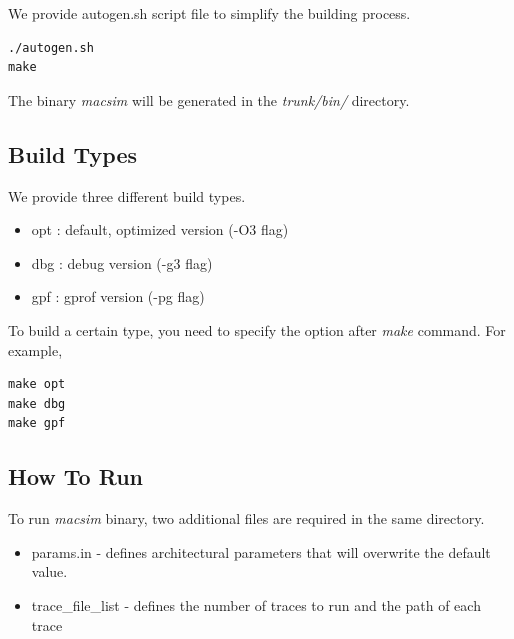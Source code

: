 \noindent
We provide autogen.sh script file to simplify the building process.

\begin{Verbatim}
./autogen.sh
make
\end{Verbatim}

The binary \textit{macsim} will be generated in the
\textit{trunk/bin/} directory.





\subsection{Build Types}

We provide three different build types.

\begin{itemize}
  \item opt : default, optimized version (-O3 flag)
  \item dbg : debug version (-g3 flag)
  \item gpf : gprof version (-pg flag)
\end{itemize}

To build a certain type, you need to specify the option
after \textit{make} command. For example,

\begin{Verbatim}
make opt
make dbg
make gpf
\end{Verbatim}





\subsection{How To Run \SIM}

To run \textit{macsim} binary, two additional files are required in
the same directory.

\begin{itemize}
  \item params.in - defines architectural parameters that will
  overwrite the default value.

  \item trace\_file\_list - defines the number of traces to run and
  the path of each trace
\end{itemize}

